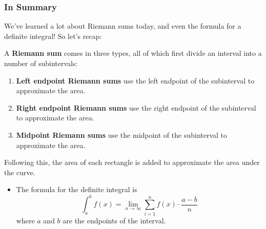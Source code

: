 \documentclass{ximera}
\begin{document}
\subsubsection{In Summary}
We've learned a lot about Riemann sums today, and even the formula for a definite integral! So let's recap:
\begin{definition}
A \textbf{Riemann sum} comes in three types, all of which first divide an interval into a number of subintervals:
\begin{enumerate}
\item{\textbf{Left endpoint Riemann sums} use the left endpoint of the subinterval to approximate the area.}
\item{\textbf{Right endpoint Riemann sums} use the right endpoint of the subinterval to approximate the area.}
\item{\textbf{Midpoint Riemann sums} use the midpoint of the subinterval to approximate the area.}
\end{enumerate}
Following this, the area of each rectangle is added to approximate the area under the curve.
\end{definition}

\begin{itemize}
\item{The formula for the definite integral is $$\displaystyle \int_a^b f(x) = \lim_{n\to\infty} \sum_{i=1}^n f(x) \cdot \frac{a-b}{n}$$where $a$ and $b$ are the endpoints of the interval.}
\end{itemize}
\pagebreak
\end{document}
